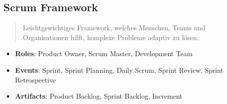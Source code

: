 \documentclass{article}
\begin{document}
\subsection{Scrum Framework}
\begin{quote}Leichtgewichtiges Framework, welches Menschen, Teams und Organisationen hilft, komplexe Probleme adaptiv zu lösen.\end{quote}

\begin{itemize}
  \item \textbf{Roles}: Product Owner, Scrum Master, Development Team
  \item \textbf{Events}: Sprint, Sprint Planning, Daily Scrum, Sprint Review, Sprint Retrospective
  \item \textbf{Artifacts}: Product Backlog, Sprint Backlog, Increment
\end{itemize}
\end{document}
